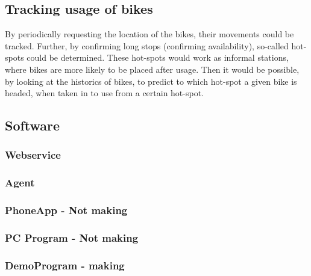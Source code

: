 \subsection{Tracking usage of bikes}
By periodically requesting the location of the bikes, their movements could be tracked.
Further, by confirming long stops (confirming availability), so-called hot-spots could be determined.
These hot-spots would work as informal stations, where bikes are more likely to be placed after usage.
Then it would be possible, by looking at the historics of bikes, to predict to which hot-spot a given bike is headed, when taken in to use from a certain hot-spot.

\subsection{Software}
\subsubsection{Webservice}
\subsubsection{Agent}
\subsubsection{PhoneApp - Not making}
\subsubsection{PC Program - Not making}
\subsubsection{DemoProgram - making}